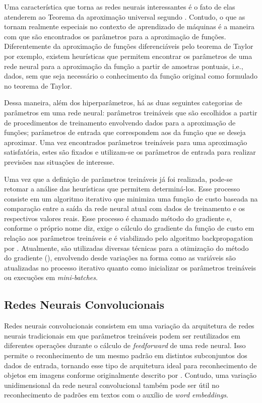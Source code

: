 Uma característica que torna as redes neurais interessantes é o fato de elas atenderem ao Teorema da aproximação universal segundo \cite{HORNIK1991251}. Contudo, o que as tornam realmente especiais no contexto de aprendizado de máquinas é a maneira com que são encontrados os parâmetros para a aproximação de funções. Diferentemente da aproximação de funções diferenciáveis pelo teorema de Taylor por exemplo, existem heurísticas que permitem encontrar os parâmetros de uma rede neural para a aproximação da função a partir de amostras pontuais, i.e., dados, sem que seja necessário o conhecimento da função original como formulado no teorema de Taylor.

Dessa maneira, além dos hiperparâmetros, há as duas seguintes categorias de parâmetros em uma rede neural: parâmetros treináveis que são escolhidos a partir de procedimentos de treinamento envolvendo dados para a aproximação de funções; parâmetros de entrada que correspondem aos da função que se deseja aproximar. Uma vez encontrados parâmetros treináveis para uma aproximação satisfatória, estes são fixados e utilizam-se os parâmetros de entrada para realizar previsões nas situações de interesse.

Uma vez que a definição de parâmetros treináveis já foi realizada, pode-se retomar a análise das heurísticas que permitem determiná-los. Esse processo consiste em um algoritmo iterativo que minimiza uma função de custo baseada na comparação entre a saída da rede neural atual com dados de treinamento e os respectivos valores reais. Esse processo é chamado método do gradiente e, conforme o próprio nome diz, exige o cálculo do gradiente da função de custo em relação aos parâmetros treináveis e é viabilizado pelo algoritmo backpropagation por \cite{Rumelhart1986}. Atualmente, são utilizadas diversas técnicas para a otimização do método do gradiente (\cite{DBLP:journals/corr/Ruder16}), envolvendo desde variações na forma como as variáveis são atualizadas no processo iterativo quanto como inicializar os parâmetros treináveis ou execuções em \textit{mini-batches}.

\subsection{Redes Neurais Convolucionais}
Redes neurais convolucionais consistem em uma variação da arquitetura de redes neurais tradicionais em que parâmetros treináveis podem ser reutilizados em diferentes operações durante o cálculo de \textit{feedforward} de uma rede neural. Isso permite o reconhecimento de um mesmo padrão em distintos subconjuntos dos dados de entrada, tornando esse tipo de arquitetura ideal para reconhecimento de objetos em imagens conforme originalmente descrito por \cite{LeCun1999}. Contudo, uma variação unidimensional da rede neural convolucional também pode ser útil no reconhecimento de padrões em textos com o auxílio de \textit{word embeddings}.

